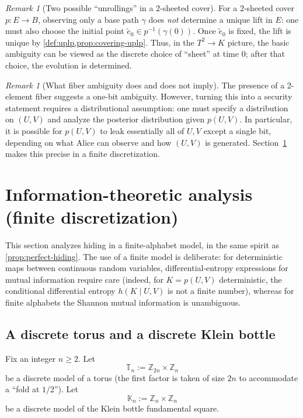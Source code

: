 \documentclass[11pt,a4paper]{article}
\theoremstyle{definition}
\theoremstyle{remark}
\newtheorem{remark}[theorem]{Remark}
\begin{document}
\begin{remark}[Two possible ``unrollings'' in a \(2\)-sheeted cover]
\label{rem:two-unrollings}
For a \(2\)-sheeted cover \(p:E\to B\), observing only a base path \(\gamma\) does \emph{not} determine a unique lift in \(E\): one must also choose the initial point \(\tilde e_0\in p^{-1}(\gamma(0))\). Once \(\tilde e_0\) is fixed, the lift is unique by \cref{def:uplp,prop:covering-uplp}. Thus, in the \(T^2\to K\) picture, the basic ambiguity can be viewed as the discrete choice of ``sheet'' at time \(0\); after that choice, the evolution is determined.
\end{remark}

\begin{remark}[What fiber ambiguity does and does not imply]
\label{rem:not-security}
The presence of a 2-element fiber suggests a one-bit ambiguity. However, turning this into a security statement requires a distributional assumption: one must specify a distribution on \((U,V)\) and analyze the posterior distribution given \(p(U,V)\). In particular, it is possible for \(p(U,V)\) to leak essentially all of \(U,V\) except a single bit, depending on what Alice can observe and how \((U,V)\) is generated. Section~\ref{sec:info-theory} makes this precise in a finite discretization.
\end{remark}

\section{Information-theoretic analysis (finite discretization)}
\label{sec:info-theory}

This section analyzes hiding in a finite-alphabet model, in the same spirit as \cref{prop:perfect-hiding}. The use of a finite model is deliberate: for deterministic maps between continuous random variables, differential-entropy expressions for mutual information require care (indeed, for \(K=p(U,V)\) deterministic, the conditional differential entropy \(h(K\mid U,V)\) is not a finite number), whereas for finite alphabets the Shannon mutual information is unambiguous.

\subsection{A discrete torus and a discrete Klein bottle}
\label{sec:discrete-model}

Fix an integer \(n\ge 2\). Let
\[
\mathbb{T}_n := \mathbb{Z}_{2n}\times \mathbb{Z}_{n}
\]
be a discrete model of a torus (the first factor is taken of size \(2n\) to accommodate a ``fold at \(1/2\)''). Let
\[
\mathbb{K}_n := \mathbb{Z}_{n}\times \mathbb{Z}_{n}
\]
be a discrete model of the Klein bottle fundamental square.
\end{document}
